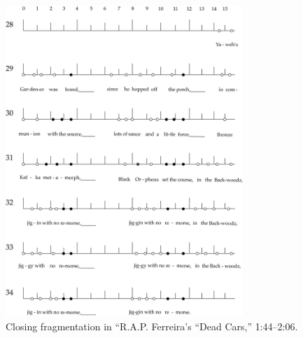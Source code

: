     \begin{figure}[!t]
        \centering
        \includegraphics[width=0.8\textwidth]{images/figures/chp 03/144206deadcarsendfrag.pdf}
        \caption{Closing fragmentation in ``R.A.P. Ferreira's ``Dead Cars,'' 1:44--2:06.}
        \label{fig:roryclosingfrag}
    \end{figure}

